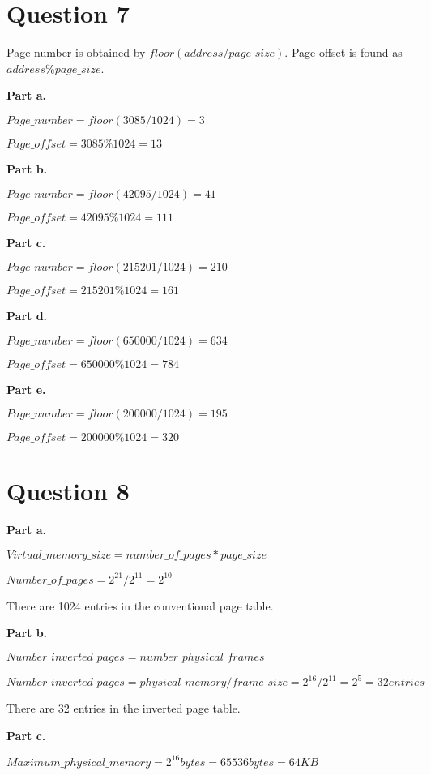\documentclass[a4paper]{article}
\begin{document}
	\section{Question 7}
	\par Page number is obtained by $floor(address / page\_size)$.
	Page offset is found as $address \% page\_size$.
	\par \textbf{Part a.}
	\par $Page\_number = floor(3085 / 1024) = 3$
	\par $Page\_offset = 3085 \% 1024 = 13$
	\par \textbf{Part b.}
	\par $Page\_number = floor(42095 / 1024) = 41$
	\par $Page\_offset = 42095 \% 1024 = 111$
	\par \textbf{Part c.}
	\par $Page\_number = floor(215201 / 1024) = 210$
	\par $Page\_offset = 215201 \% 1024 = 161$
	\par \textbf{Part d.}
	\par $Page\_number = floor(650000 / 1024) = 634$
	\par $Page\_offset = 650000 \% 1024 = 784$
	\par \textbf{Part e.}
	\par $Page\_number = floor(200000 / 1024) = 195$
	\par $Page\_offset = 200000 \% 1024 = 320$

	\section{Question 8}
	\par \textbf{Part a.}
	\par $Virtual\_memory\_size = number\_of\_pages * page\_size$
	\par $Number\_of\_pages = 2^{21} / 2^{11} = 2^{10}$
	\par There are 1024 entries in the conventional page table.
	\par \textbf{Part b.}
	\par $Number\_inverted\_pages = number\_physical\_frames$
	\par $Number\_inverted\_pages = physical\_memory / frame\_size =
	2^{16} / 2^{11} = 2^{5} = 32 entries$
	\par There are 32 entries in the inverted page table.
	\par \textbf{Part c.}
	\par $Maximum\_physical\_memory = 2^{16} bytes = 65536 bytes = 64KB$
\end{document}
